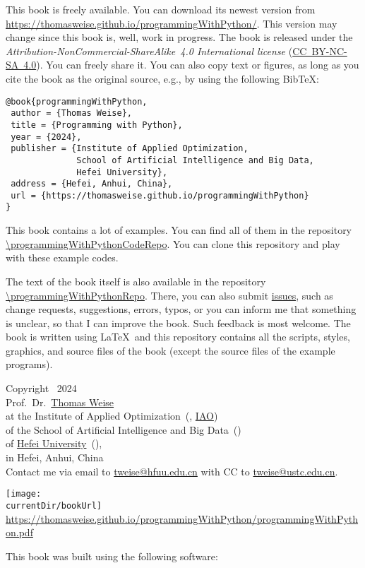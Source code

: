 This book is freely available.
You can download its newest version from \url{https://thomasweise.github.io/programmingWithPython/}.
This version may change since this book is, well, work in progress.
The book is released under the \emph{Attribution-NonCommercial-ShareAlike~4.0 International license} (\href{http://creativecommons.org/licenses/by-nc-sa/4.0/}{\mbox{CC~BY-NC-SA~4.0}}).
You can freely share it.
You can also copy text or figures, as long as you cite the book as the original source, e.g., by using the following Bib\TeX:%
%
\begin{lstlisting}[style=text_style]
@book{programmingWithPython,
 author = {Thomas Weise},
 title = {Programming with Python},
 year = {2024},
 publisher = {Institute of Applied Optimization,
              School of Artificial Intelligence and Big Data,
              Hefei University},
 address = {Hefei, Anhui, China},
 url = {https://thomasweise.github.io/programmingWithPython}
}
\end{lstlisting}
%
This book contains a lot of examples.
You can find all of them in the repository \url{\programmingWithPythonCodeRepo}.
You can clone this repository and play with these example codes.%
%
\begin{sloppypar}%
The text of the book itself is also available in the repository \url{\programmingWithPythonRepo}.
There, you can also submit \href{\programmingWithPythonRepo/issues}{issues}, such as change requests, suggestions, errors, typos, or you can inform me that something is unclear, so that I can improve the book.
Such feedback is most welcome.
The book is written using \LaTeX\ and this repository contains all the scripts, styles, graphics, and source files of the book (except the source files of the example programs).%
\end{sloppypar}%
%
\strut\vfill\strut%
%
\begin{flushleft}%
Copyright \textcopyright\ 2024\\[3pt]%
Prof.~Dr.~\href{http://iao.hfuu.edu.cn/5}{Thomas Weise}~\\%
at the Institute of Applied Optimization~(, \href{http://iao.hfuu.edu.cn}{IAO})\\%
of the School of Artificial Intelligence and Big Data~(\href{http://www.hfuu.edu.cn/aibd}{})\\%
of \href{http://www.hfuu.edu.cn/english}{Hefei University}~(\href{http://www.hfuu.edu.cn}{}),\\%
in Hefei, Anhui, China~\\[6pt]%
Contact me via email to \href{mailto:tweise@hfuu.edu.cn}{tweise@hfuu.edu.cn} with CC to \href{mailto:tweise@ustc.edu.cn}{tweise@ustc.edu.cn}.%
\end{flushleft}%
%
\clearpage%
%
\strut\vfill\strut%
%
\begin{center}%
\texttt{[image: \\currentDir/bookUrl]}\\%
\url{https://thomasweise.github.io/programmingWithPython/programmingWithPython.pdf}%
\end{center}%
%
\strut\vfill\strut%
This book was built using the following software:%
%
